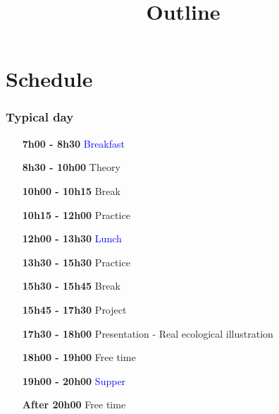 \documentclass{eecslides}
\title[Outline]{Outline}
\begin{document}
\begin{frame}
  \titlepage
\end{frame}

\section{Schedule}

\begin{frame}

\frametitle{Typical day}

\large

\begin{itemize}[leftmargin=2.5cm]
  \item[\bf 7h00 - 8h30] \textcolor{blue}{Breakfast}
  \item[\bf 8h30 - 10h00] Theory
  \item[\bf 10h00 - 10h15] \textcolor{green!50!black}{Break}
  \item[\bf 10h15 - 12h00] Practice
  \item[\bf 12h00 - 13h30] \textcolor{blue}{Lunch}
  \item[\bf 13h30 - 15h30] Practice
  \item[\bf 15h30 - 15h45] \textcolor{green!50!black}{Break}
  \item[\bf 15h45 - 17h30] Project
  \item[\bf 17h30 - 18h00] Presentation - Real ecological illustration
  \item[\bf 18h00 - 19h00] \textcolor{green!50!black}{Free time}
  \item[\bf 19h00 - 20h00] \textcolor{blue}{Supper}
  \item[\bf After 20h00] \textcolor{green!50!black}{Free time}
\end{itemize}

\end{frame}
\end{document}
